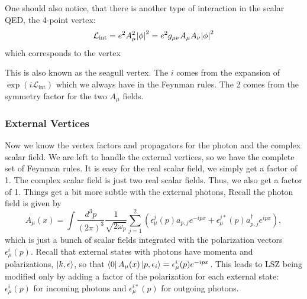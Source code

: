 \documentclass[11pt]{article}
\theoremstyle{definition}
\begin{document}
One should also notice, that there is another type of interaction in the scalar QED, the 4-point vertex:
\begin{equation}
    \mathcal{L}_\text{int} = e^2 A_\mu^2 \abs{\phi}^2 = e^2 g_{\mu\nu} A_\mu A_\nu \abs{\phi}^2
\end{equation}
which corresponds to the vertex
\begin{center}
\end{center}
This is also known as the seagull vertex. The $i$ comes from the expansion of $\exp(i\mathcal{L}_\text{int})$ which we always have in the Feynman rules. The 2 comes from the symmetry factor for the two $A_\mu$ fields.

\subsubsection{External Vertices}
Now we know the vertex factors and propagators for the photon and the complex scalar field. We are left to handle the external vertices, so we have the complete set of Feynman rules. It is easy for the real scalar field, we simply get a factor of 1. The complex scalar field is just two real scalar fields. Thus, we also get a factor of 1. Things get a bit more subtle with the external photons,
Recall the photon field is given by
\begin{equation}
    A_\mu(x) = \int\frac{d^3p}{(2\pi)^3}\frac{1}{\sqrt{2\omega_p}}\sum_{j=1}^2(\epsilon_\mu^j(p)a_{p,j}e^{-ipx} + \epsilon_\mu^{j*}(p)a_{p,j}^\dagger e^{ipx}),
\end{equation}
which is just a bunch of scalar fields integrated with the polarization vectors $\epsilon_\mu^i(p)$. Recall that external states with photons have momenta and polarizations, $\ket{k, \epsilon}$, so that $\bra{0}A_\mu(x)\ket{p, \epsilon_i} = \epsilon_\mu ^i(p) e^{-ipx}$. This leads to LSZ being modified only by adding a factor of the polarization for each external state: $\epsilon_\mu ^i(p)$ for incoming photons and $\epsilon_\mu ^{i*}(p)$ for outgoing photons.
\end{document}
